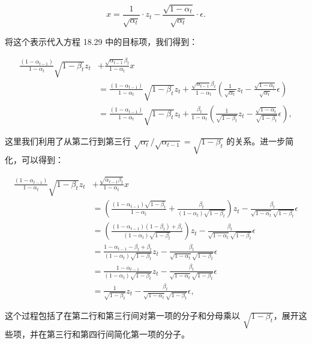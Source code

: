 \begin{equation}
x = \frac{1}{\sqrt{\alpha_t}} \cdot z_t - \frac{\sqrt{1 - \alpha_t}}{\sqrt{\alpha_t}} \cdot \epsilon. 
\end{equation}

将这个表示代入方程 18.29 中的目标项，我们得到：

\begin{align}
\frac{(1 - \alpha_{t-1})}{1 - \alpha_t} \sqrt{1 - \beta_t}z_t &+ \frac{\sqrt{\alpha_{t-1}}\beta_t}{1 - \alpha_t}x  \\
&= \frac{(1 - \alpha_{t-1})}{1 - \alpha_t} \sqrt{1 - \beta_t} z_t + \frac{\sqrt{\alpha_{t-1}}\beta_t}{1 - \alpha_t} \left( \frac{1}{\sqrt{\alpha_t}} z_t - \frac{\sqrt{1 - \alpha_t}}{\sqrt{\alpha_t}} \epsilon \right) \\
&= \frac{(1 - \alpha_{t-1})}{1 - \alpha_t} \sqrt{1 - \beta_t} z_t + \frac{\beta_t}{1 - \alpha_t} \left( \frac{1}{\sqrt{1 - \beta_t}} z_t - \frac{\sqrt{1 - \alpha_t}}{\sqrt{1 - \beta_t}} \epsilon \right), 
\end{align} 


这里我们利用了从第二行到第三行 \(\sqrt{\alpha_t} / \sqrt{\alpha_{t-1}} = \sqrt{1 - \beta_t}\) 的关系。进一步简化，可以得到：

\begin{align}
\frac{(1 - \alpha_{t-1})}{1 - \alpha_t} \sqrt{1 - \beta_t} z_t &+ \frac{\sqrt{\alpha_{t-1}\beta_t}}{1 - \alpha_t} x  \\
&= \left( \frac{(1 - \alpha_{t-1})\sqrt{1 - \beta_t}}{1 - \alpha_t} + \frac{\beta_t}{(1 - \alpha_t)\sqrt{1 - \beta_t}} \right) z_t - \frac{\beta_t}{\sqrt{1 - \alpha_t}\sqrt{1 - \beta_t}} \epsilon \\
&= \left( \frac{(1 - \alpha_{t-1})(1 - \beta_t) + \beta_t}{(1 - \alpha_t)\sqrt{1 - \beta_t}} \right) z_t - \frac{\beta_t}{\sqrt{1 - \alpha_t}\sqrt{1 - \beta_t}} \epsilon \\
&= \frac{1 - \alpha_{t-1} - \beta_t + \beta_t}{(1 - \alpha_t)\sqrt{1 - \beta_t}} z_t - \frac{\beta_t}{\sqrt{1 - \alpha_t}\sqrt{1 - \beta_t}} \epsilon \\
&= \frac{1 - \alpha_{t-1}}{(1 - \alpha_t)\sqrt{1 - \beta_t}} z_t - \frac{\beta_t}{\sqrt{1 - \alpha_t}\sqrt{1 - \beta_t}} \epsilon \\
&= \frac{1}{\sqrt{1 - \beta_t}} z_t - \frac{\beta_t}{\sqrt{1 - \alpha_t}\sqrt{1 - \beta_t}} \epsilon, 
\end{align} 



这个过程包括了在第二行和第三行间对第一项的分子和分母乘以 \(\sqrt{1 - \beta_t}\)，展开这些项，并在第三行和第四行间简化第一项的分子。

